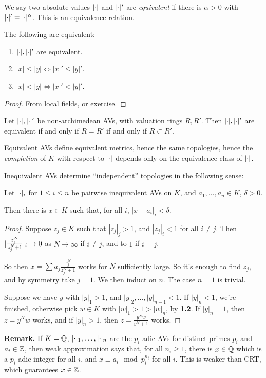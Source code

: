 \documentclass[10pt,a4paper]{article}
\begin{document}
We say two absolute values $\lvert\cdot\rvert$ and $\lvert\cdot\rvert'$ are \emph{equivalent} if there is $\alpha > 0$ with $\lvert\cdot\rvert' =\lvert\cdot\rvert^{\alpha}$. This is an equivalence relation.
\begin{proposition}
  The following are equivalent:
  \begin{enumerate}[label=\roman*)]
    \item $\lvert\cdot\rvert, \lvert\cdot\rvert'$ are equivalent.
    \item $|x| \leq |y| \iff |x|'\leq |y|'$.
    \item $|x| < |y| \iff |x|' < |y|'$.
  \end{enumerate}
\end{proposition}
\begin{proof}
  From local fields, or exercise.
\end{proof}
\begin{corollary}
  Let $\lvert\cdot\rvert, \lvert\cdot\rvert'$ be non-archimedean AVs, with valuation rings $R, R'$. Then $\lvert\cdot\rvert, \lvert\cdot\rvert'$ are equivalent if and only if $R = R'$ if and only if $R \subset R'$.
\end{corollary}
Equivalent AVs define equivalent metrics, hence the same topologies, hence the \emph{completion} of $K$ with respect to $\lvert\cdot\rvert$ depends only on the equivalence class of $\lvert\cdot\rvert$.

Inequivalent AVs determine ``independent'' topologies in the following sense:
\begin{proposition}
  Let $\lvert\cdot\rvert_i$ for $1\leq i\leq n$ be pairwise inequivalent AVs on $K$, and $a_1, \ldots, a_n \in K$, $\delta > 0$.

  Then there is $x \in K$ such that, for all $i$, $|x-a_i|_i < \delta$.
\end{proposition}
\begin{proof}
  Suppose $z_j \in K$ such that $|z_j|_j > 1$, and $|z_j|_i < 1$ for all $i \neq j$. Then $\lvert\frac{z_j^N}{z_j^N + 1}\rvert_i \to 0$ as $N \to \infty$ if $i \neq j$, and to $1$ if $i=j$.

  So then $x = \sum a_j \frac{z_j^N}{z_j^N + 1}$ works for $N$ sufficiently large. So it's enough to find $z_j$, and by symmetry take $j=1$. We then induct on $n$. The case $n=1$ is trivial.

  Suppose we have $y$ with $|y|_1 > 1$, and $|y|_2, \ldots, |y|_{n-1} < 1$. If $|y|_n < 1$, we're finished, otherwise pick $w \in K$ with $|w|_1 > 1 > |w|_n$, by \textbf{1.2}. If $|y|_n=1$, then $z = y^Nw$ works, and if $|y|_n > 1$, then $z = \frac{y^Nw}{y^N+1}$ works.
\end{proof}
\textbf{Remark.} If $K = \mathbb{Q}$, $\lvert\cdot\rvert_1, \ldots, \lvert\cdot\rvert_n$ are the $p_i$-adic AVs for distinct primes $p_i$ and $a_i \in \mathbb{Z}$, then weak approximation says that, for all $n_i \geq 1$, there is $x \in \mathbb{Q}$ which is a $p_i$-adic integer for all $i$, and $x \equiv a_i \mod p_i^{n_i}$ for all $i$. This is weaker than CRT, which guarantees $x \in \mathbb{Z}$.
\end{document}
